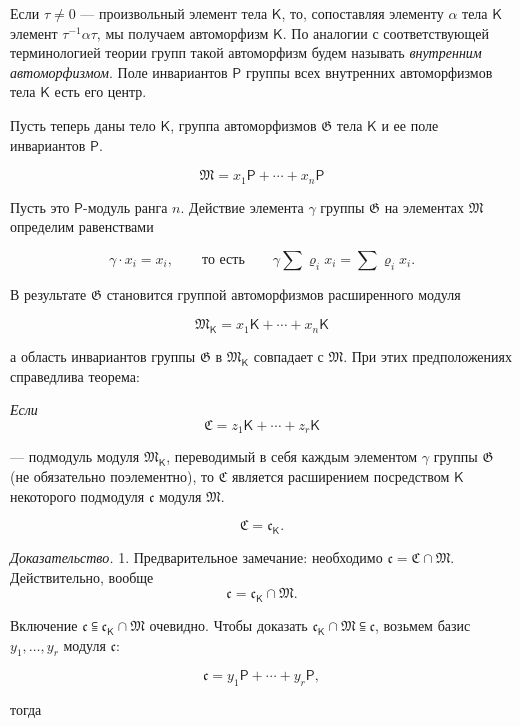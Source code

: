 \documentclass[11pt]{article}
\begin{document}
Если \(\tau\ne 0\) --- произвольный элемент тела \(\mathsf K\), то, сопоставляя элементу \(\alpha\) тела \(\mathsf K\) элемент \(\tau^{-1}\alpha\tau\), мы получаем автоморфизм \(\mathsf K\). По аналогии с соответствующей терминологией теории групп такой автоморфизм будем называть \emph{внутренним автоморфизмом}. Поле инвариантов \(\mathsf P\) группы всех внутренних автоморфизмов тела \(\mathsf K\) есть его центр.

Пусть теперь даны тело \(\mathsf K\), группа автоморфизмов \(\mathfrak G\) тела \(\mathsf K\) и ее поле инвариантов \(\mathsf P\).

\[
\mathfrak M=x_1\mathsf P+\cdots+x_n\mathsf P
\]

Пусть это \(\mathsf P\)-модуль ранга \(n\). Действие элемента \(\gamma\) группы \(\mathfrak G\) на элементах \(\mathfrak M\) определим равенствами

\[
\gamma\cdot x_i=x_i,\qquad\text{то есть}\qquad
\gamma\sum \varrho_i x_i=\sum \varrho_i x_i.
\]

В результате \(\mathfrak G\) становится группой автоморфизмов расширенного модуля

\[
\mathfrak M_{\mathsf K}=x_1\mathsf K+\cdots+x_n\mathsf K
\]

а область инвариантов группы \(\mathfrak G\) в \(\mathfrak M_{\mathsf K}\) совпадает с \(\mathfrak M\). При этих предположениях справедлива теорема:

\begingroup\itshape
Если
\[
\mathfrak C=z_1\mathsf K+\cdots+z_r\mathsf K
\]

--- подмодуль модуля \(\mathfrak M_{\mathsf K}\), переводимый в себя каждым элементом \(\gamma\) группы \(\mathfrak G\) (не обязательно поэлементно), то \(\mathfrak C\) является расширением посредством \(\mathsf K\) некоторого подмодуля \(\mathfrak c\) модуля \(\mathfrak M\).

\[
\mathfrak C=\mathfrak c_{\mathsf K}.
\]
\endgroup

\emph{Доказательство.} 1. Предварительное замечание: необходимо \(\mathfrak c=\mathfrak C\cap\mathfrak M\). Действительно, вообще
\[
\mathfrak c=\mathfrak c_{\mathsf K}\cap\mathfrak M.
\]

Включение \(\mathfrak c\subseteqq\mathfrak c_{\mathsf K}\cap\mathfrak M\) очевидно. Чтобы доказать \(\mathfrak c_{\mathsf K}\cap\mathfrak M\subseteqq\mathfrak c\), возьмем базис \(y_1,\ldots,y_r\) модуля \(\mathfrak c\):

\[
\mathfrak c=y_1\mathsf P+\cdots+y_r\mathsf P,
\]

тогда
\end{document}
